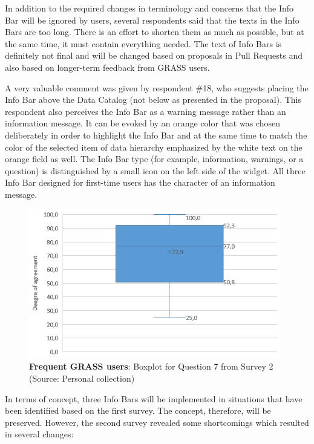 \documentclass[a4paper,10pt,twoside]{article}
\begin{document}
\noindent In addition to the required changes in terminology and concerns that the Info Bar will be ignored by users, several respondents said that the texts in the Info Bars are too long. There is an effort to shorten them as much as possible, but at the same time, it must contain everything needed. The text of Info Bars is definitely not final and will be changed based on proposals in Pull Requests and also based on longer-term feedback from GRASS users.

A very valuable comment was given by respondent \#18, who suggests placing the Info Bar above the Data Catalog (not below as presented in the proposal). This respondent also perceives the Info Bar as a warning message rather than an information message. It can be evoked by an orange color that was chosen deliberately in order to highlight the Info Bar and at the same time to match the color of the selected item of data hierarchy emphasized by the white text on the orange field as well. The Info Bar type (for example, information, warnings, or a question) is distinguished by a small icon on the left side of the widget. All three Info Bar designed for first-time users has the character of an information message.

\vspace{0.3cm}
\begin{figure}[hbt!] 
\begin{center}
\includegraphics[width=11cm]{../surveys/analyzed_data/survey2_question7_boxplot_group2.png} 
\caption[\textbf{Frequent GRASS users}: Boxplot for Question 7 from Survey 2]{\textbf{Frequent GRASS users}: Boxplot for Question 7 from Survey 2 (Source: Personal collection)}
\label{fig:survey2_question7_boxplot_group2}
\end{center}
\end{figure}

\noindent In terms of concept, three Info Bars will be implemented in situations that have been identified based on the first survey. The concept, therefore, will be preserved. However, the second survey revealed some shortcomings which resulted in several changes:
\end{document}
